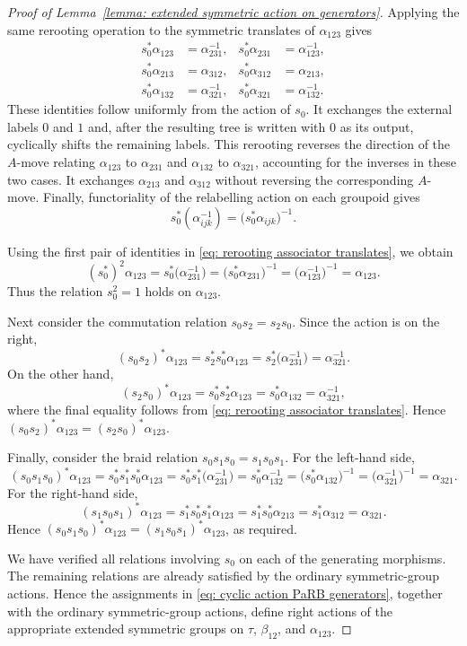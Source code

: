 \documentclass{amsart}
\newcommand{\twist}{\tau}
\theoremstyle{definition}
\numberwithin{equation}{section}
\begin{document}
\begin{proof}[Proof of Lemma~\ref{lemma: extended symmetric action on generators}]
Applying the same rerooting operation to the symmetric translates of
$\alpha_{123}$ gives
\begin{equation}
\label{eq: rerooting associator translates}
\tag{\(\dagger\)}
\begin{aligned}
s_0^*\alpha_{123}&=\alpha_{231}^{-1}, &
s_0^*\alpha_{231}&=\alpha_{123}^{-1},\\
s_0^*\alpha_{213}&=\alpha_{312}, &
s_0^*\alpha_{312}&=\alpha_{213},\\
s_0^*\alpha_{132}&=\alpha_{321}^{-1}, &
s_0^*\alpha_{321}&=\alpha_{132}^{-1}.
\end{aligned}
\end{equation}
These identities follow uniformly from the action of $s_0$. It
exchanges the external labels $0$ and $1$ and, after the resulting
tree is written with $0$ as its output, cyclically shifts the
remaining labels. This rerooting reverses the direction of the
$A$-move relating $\alpha_{123}$ to $\alpha_{231}$ and
$\alpha_{132}$ to $\alpha_{321}$, accounting for the inverses in
these two cases. It exchanges $\alpha_{213}$ and $\alpha_{312}$
without reversing the corresponding $A$-move. Finally, functoriality
of the relabelling action on each groupoid gives
\[
s_0^*(\alpha_{ijk}^{-1})
=
\bigl(s_0^*\alpha_{ijk}\bigr)^{-1}.
\]

Using the first pair of identities in
\eqref{eq: rerooting associator translates}, we obtain
\[
(s_0^*)^2\alpha_{123}
=s_0^*\bigl(\alpha_{231}^{-1}\bigr)
=\bigl(s_0^*\alpha_{231}\bigr)^{-1}
=\bigl(\alpha_{123}^{-1}\bigr)^{-1}
=\alpha_{123}.
\]
Thus the relation $s_0^2=1$ holds on $\alpha_{123}$.

Next consider the commutation relation $s_0s_2=s_2s_0$. Since the
action is on the right,
\[
(s_0s_2)^*\alpha_{123}
=s_2^*s_0^*\alpha_{123}
=s_2^*\bigl(\alpha_{231}^{-1}\bigr)
=\alpha_{321}^{-1}.
\]
On the other hand,
\[
(s_2s_0)^*\alpha_{123}
=s_0^*s_2^*\alpha_{123}
=s_0^*\alpha_{132}
=\alpha_{321}^{-1},
\]
where the final equality follows from
\eqref{eq: rerooting associator translates}. Hence
$(s_0s_2)^*\alpha_{123}=(s_2s_0)^*\alpha_{123}$.

Finally, consider the braid relation $s_0s_1s_0=s_1s_0s_1$. For the
left-hand side,
\[
(s_0s_1s_0)^*\alpha_{123}
=s_0^*s_1^*s_0^*\alpha_{123}
=s_0^*s_1^*\bigl(\alpha_{231}^{-1}\bigr)
=s_0^*\alpha_{132}^{-1}
=\bigl(s_0^*\alpha_{132}\bigr)^{-1}
=\bigl(\alpha_{321}^{-1}\bigr)^{-1}
=\alpha_{321}.
\]
For the right-hand side,
\[
(s_1s_0s_1)^*\alpha_{123}
=s_1^*s_0^*s_1^*\alpha_{123}
=s_1^*s_0^*\alpha_{213}
=s_1^*\alpha_{312}
=\alpha_{321}.
\]
Hence $(s_0s_1s_0)^*\alpha_{123}=(s_1s_0s_1)^*\alpha_{123}$,
as required.

We have verified all relations involving $s_0$ on each of the
generating morphisms. The remaining relations are already satisfied
by the ordinary symmetric-group actions. Hence the assignments in
\eqref{eq: cyclic action PaRB generators}, together with the ordinary
symmetric-group actions, define right actions of the appropriate
extended symmetric groups on $\twist$, $\beta_{12}$, and
$\alpha_{123}$.
\end{proof}
\end{document}
